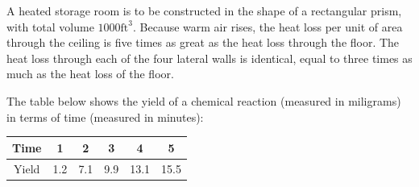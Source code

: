 \documentclass[11pt]{exam}
\begin{document}
%
%
%

\begin{questions}


\addpoints
\question A heated storage room is to be constructed in the shape of a rectangular prism, with total volume $1000 \mathrm{ft}^3$. Because warm air rises, the heat loss per unit of area through the ceiling is five times as great as the heat loss through the floor. The heat loss through each of the four lateral walls is identical, equal to three times as much as the heat loss of the floor. 

\newpage 


\addpoints 
\question The table below shows the yield of a chemical reaction (measured in miligrams) in terms of time (measured in minutes):
\begin{center}
\begin{tabular}{|c|c|c|c|c|c|}
\hline 
Time & 1 & 2 & 3 & 4 & 5 \\ 
\hline 
Yield & 1.2 & 7.1 & 9.9 & 13.1 & 15.5 \\ 
\hline 
\end{tabular} 
\end{center}


\end{questions}
\end{document}
